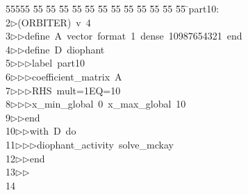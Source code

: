 %
%
\begin{tabbing}
55555 \= 55 \= 55 \= 55 \= 55 \= 55 \= 55 \= 55 \= 55 \= 55 \= 55 \= 55 \= 55 \= \>part10:\\[0pt]
2\>$\triangleright$\>(ORBITER)\ v\ 4\ \\[0pt]
3\>$\triangleright$\>$\triangleright$\>define\ A\ vector\ format\ 1\ dense\ 10987654321\ end\ \\[0pt]
4\>$\triangleright$\>$\triangleright$\>define\ D\ diophant\ \\[0pt]
5\>$\triangleright$\>$\triangleright$\>$\triangleright$\>label\ part10\ \\[0pt]
6\>$\triangleright$\>$\triangleright$\>$\triangleright$\>coefficient\_matrix\ A\ \\[0pt]
7\>$\triangleright$\>$\triangleright$\>$\triangleright$\>RHS\ mult=1EQ=10\ \\[0pt]
8\>$\triangleright$\>$\triangleright$\>$\triangleright$\>x\_min\_global\ 0\ x\_max\_global\ 10\ \\[0pt]
9\>$\triangleright$\>$\triangleright$\>end\ \\[0pt]
10\>$\triangleright$\>$\triangleright$\>with\ D\ do\ \\[0pt]
11\>$\triangleright$\>$\triangleright$\>$\triangleright$\>diophant\_activity\ solve\_mckay\ \\[0pt]
12\>$\triangleright$\>$\triangleright$\>end\\[0pt]
13\>$\triangleright$\>$\triangleright$\>\\[0pt]
14\>\end{tabbing}
